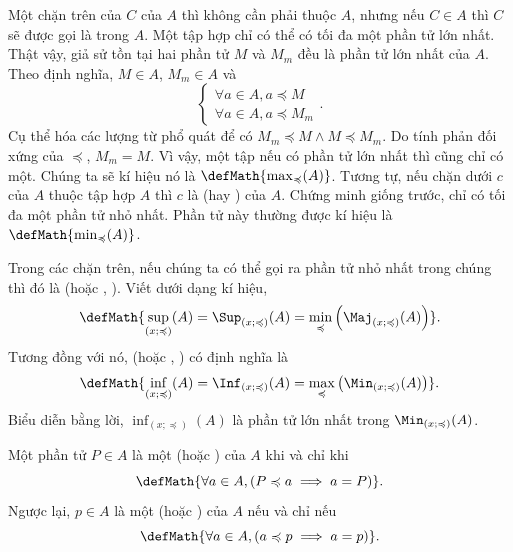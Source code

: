 Một chặn trên của $C$ của $A$ thì không cần phải thuộc $A$, nhưng nếu $C \in A$ thì $C$ sẽ được gọi là  trong $A$. Một tập hợp chỉ có thể có tối đa một phần tử lớn nhất. Thật vậy, giả sử tồn tại hai phần tử $M$ và $M_m$ đều là phần tử lớn nhất của $A$. Theo định nghĩa, $M \in A$, $M_m \in A$ và
\begin{equation*}
   \begin{cases}
      \forall a \in A, a \preccurlyeq M \\
      \forall a \in A, a \preccurlyeq M_m
   \end{cases}.
\end{equation*} 
Cụ thể hóa các lượng từ phổ quát để có $M_m \preccurlyeq M \land M \preccurlyeq M_m$. Do tính phản đối xứng của $\preccurlyeq$, $M_m = M$. Vì vậy, một tập nếu có phần tử lớn nhất thì cũng chỉ có một. Chúng ta sẽ kí hiệu nó là ${\defMath{\max_{\preccurlyeq}(A)}}$. Tương tự, nếu chặn dưới $c$ của $A$ thuộc tập hợp $A$ thì $c$ là  (hay ) của $A$. Chứng minh giống trước, chỉ có tối đa một phần tử nhỏ nhất. Phần tử này thường được kí hiệu là $\defMath{\min_{\preccurlyeq}(A)}$.

Trong các chặn trên, nếu chúng ta có thể gọi ra phần tử nhỏ nhất trong chúng thì đó là  (hoặc , ). Viết dưới dạng kí hiệu, 
\begin{equation*}
   \defMath{\sup_{(x; \preccurlyeq)}(A) = \Sup_{(x; \preccurlyeq)}(A) = \min_{\preccurlyeq}\left(\Maj_{\left(x; \preccurlyeq\right)}(A)\right)}.
\end{equation*}
Tương đồng với nó,  (hoặc , ) có định nghĩa là
\begin{equation*}
   \defMath{\inf_{(x; \preccurlyeq)}(A) = \Inf_{(x; \preccurlyeq)}(A) = \max_{\preccurlyeq}\left(\Min_{\left(x; \preccurlyeq\right)}(A)\right)}.
\end{equation*}
Biểu diễn bằng lời, $\inf_{(x; \preccurlyeq)}(A)$ là phần tử lớn nhất trong $\Min_{\left(x; \preccurlyeq\right)}(A)$.

Một phần tử $P \in A$ là một  (hoặc ) của $A$ khi và chỉ khi
\begin{equation*}
   \defMath{\forall a \in A, (P \preccurlyeq a \implies a = P)}.
\end{equation*}
Ngược lại, $p \in A$ là một  (hoặc ) của $A$ nếu và chỉ nếu
\begin{equation*}
   \defMath{\forall a \in A, (a \preccurlyeq p \implies a = p)}.
\end{equation*}

